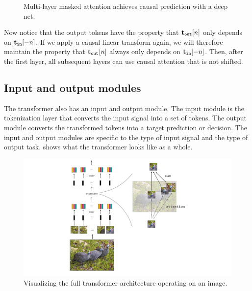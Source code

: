 \begin{figure}[h]
{\begin{minipage}{.49\linewidth}
\end{minipage}
}
\caption{Multi-layer masked attention achieves causal prediction with a deep net.}
\label{fig:transformers:multilayer_masked_attention}
\end{figure}

Now notice that the output tokens have the property that $\mathbf{t}_{\texttt{out}}[n]$ only depends on $\mathbf{t}_{\texttt{in}}[-n]$. If we apply a causal linear transform again, we will therefore maintain the property that $\mathbf{t}_{\texttt{out}}[n]$ always only depends on $\mathbf{t}_{\texttt{in}}[-n]$. Then, after the first layer, all subsequent layers can use causal attention that is not shifted.


\subsection{Input and output modules}
The transformer also has an input and output module. The input module is the tokenization layer that converts the input signal into a set of tokens. The output module converts the transformed tokens into a target prediction or decision. The input and output modules are specific to the type of input signal and the type of output task. \fig{\ref{fig:transformers:transformer_arch}} shows what the transformer looks like as a whole.
\begin{figure}[h]
    \centerline{
    \includegraphics[width=0.8\linewidth]{./figures/transformers/transformer_arch.pdf}
    }
    \caption{Visualizing the full transformer architecture operating on an image.}
    \label{fig:transformers:transformer_arch}
\end{figure}

